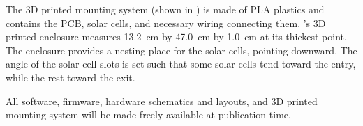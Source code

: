 The 3D printed mounting system (shown in ) is made of PLA plastics and contains the PCB, solar cells, and necessary wiring connecting them.
\sysname's 3D printed enclosure measures \SI{13.2}{\centi\meter} by \SI{47.0}{\centi\meter} by \SI{1.0}{\centi\meter} at its thickest point. The enclosure provides a nesting place for the solar cells, pointing downward.
The angle of the solar cell slots is set such that some solar cells tend toward the entry, while the rest toward the exit.

All software, firmware, hardware schematics and layouts, and 3D printed mounting system will be made freely available at publication time.

